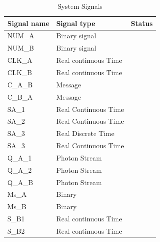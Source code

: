 \begin{table}[hbt]
\centering
\caption{System Signals}
\label{my-label}
\begin{tabular}{|l|l|l|}
\hline
\textbf{Signal name} & \textbf{Signal type} & \textbf{Status} \\ \hline
NUM\_A                &  Binary signal       &                 \\ \hline
NUM\_B                &  Binary signal       &                 \\ \hline
CLK\_A                &  Real continuous Time&                 \\ \hline
CLK\_B                &  Real continuous Time&                 \\ \hline
C\_A\_B                &  Message             &                 \\ \hline
C\_B\_A                &  Message             &                 \\ \hline
SA\_1                 &  Real Continuous Time&                 \\ \hline
SA\_2                 &  Real Continuous   Time&                 \\ \hline
SA\_3                 &  Real Discrete Time       &                 \\ \hline
SA\_3                 &  Real Continuous Time       &                 \\ \hline
Q\_A\_1                &  Photon Stream       &                 \\ \hline
Q\_A\_2                &  Photon Stream       &                 \\ \hline
Q\_A\_B                &  Photon Stream       &                 \\ \hline
Ms\_A                 &  Binary             &                 \\ \hline
Ms\_B                 &  Binary             &                 \\ \hline
S\_B1                 &  Real continuous Time&                 \\ \hline
S\_B2                 &  Real continuous Time&                 \\ \hline

\end{tabular}
\end{table}

